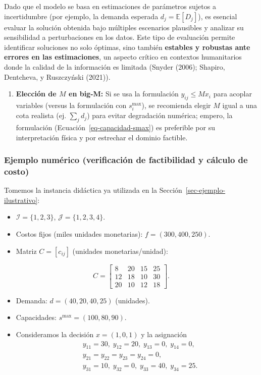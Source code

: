 \documentclass[
  spanish,
  us-letterpaper,
]{scrreprt}
\providecommand{\tightlist}{%
  \setlength{\itemsep}{0pt}\setlength{\parskip}{0pt}}
\numberwithin{equation}{section}
\begin{document}
Dado que el modelo se basa en estimaciones de parámetros sujetos a
incertidumbre (por ejemplo, la demanda esperada
\(d_j = \mathbb{E}[D_j]\)), es esencial evaluar la solución obtenida
bajo múltiples escenarios plausibles y analizar su sensibilidad a
perturbaciones en los datos. Este tipo de evaluación permite identificar
soluciones no solo óptimas, sino también \textbf{estables y robustas
ante errores en las estimaciones}, un aspecto crítico en contextos
humanitarios donde la calidad de la información es limitada (Snyder
(2006); Shapiro, Dentcheva, y Ruszczyński (2021)).

\begin{enumerate}
\def\labelenumi{\arabic{enumi}.}
\setcounter{enumi}{2}
\tightlist
\item
  \textbf{Elección de \(M\) en big-M:} Si se usa la formulación
  \(y_{ij}\le M x_i\) para acoplar variables (versus la formulación con
  \(s_i^{\max}\)), se recomienda elegir \(M\) igual a una cota realista
  (ej. \(\sum_j d_j\)) para evitar degradación numérica; empero, la
  formulación (Ecuación~\ref{eq-capacidad-smax}) es preferible por su
  interpretación física y por estrechar el dominio factible.
\end{enumerate}

\subsubsection{Ejemplo numérico (verificación de factibilidad y cálculo
de
costo)}\label{ejemplo-numuxe9rico-verificaciuxf3n-de-factibilidad-y-cuxe1lculo-de-costo}

Tomemos la instancia didáctica ya utilizada en la
Sección~\ref{sec-ejemplo-ilustrativo}:

\begin{itemize}
\tightlist
\item
  \(\mathcal{I}=\{1,2,3\}\), \(\mathcal{J}=\{1,2,3,4\}\).
\item
  Costos fijos (miles unidades monetarias): \(f=(300,400,250)\).
\item
  Matriz \(C=[c_{ij}]\) (unidades monetarias/unidad):
\end{itemize}

\[
C=
\begin{bmatrix}
8 & 20 & 15 & 25 \\
12 & 18 & 10 & 30 \\
20 & 10 & 12 & 18
\end{bmatrix}.
\]

\begin{itemize}
\tightlist
\item
  Demanda: \(d=(40,20,40,25)\) (unidades).
\item
  Capacidades: \(s^{\max}=(100,80,90)\).
\item
  Consideramos la decisión \(x=(1,0,1)\) y la asignación \[
  \begin{aligned}
  &y_{11}=30,\; y_{12}=20,\; y_{13}=0,\; y_{14}=0,\\
  &y_{21}=y_{22}=y_{23}=y_{24}=0,\\
  &y_{31}=10,\; y_{32}=0,\; y_{33}=40,\; y_{34}=25.
  \end{aligned}
  \]
\end{itemize}
\end{document}
